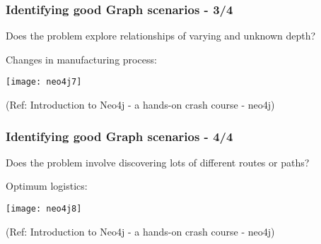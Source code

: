 \begin{frame}\frametitle{Identifying good Graph scenarios - 3/4}

Does the problem explore relationships of varying and unknown depth?

Changes in manufacturing process:

\begin{center}
\texttt{[image: neo4j7]}
\end{center}	  

{\tiny (Ref: Introduction to Neo4j - a hands-on crash course - neo4j)}
\end{frame}

\begin{frame}\frametitle{Identifying good Graph scenarios - 4/4}

Does the problem involve discovering lots of different routes or paths?

Optimum logistics:

\begin{center}
\texttt{[image: neo4j8]}
\end{center}	  

{\tiny (Ref: Introduction to Neo4j - a hands-on crash course - neo4j)}
\end{frame}

